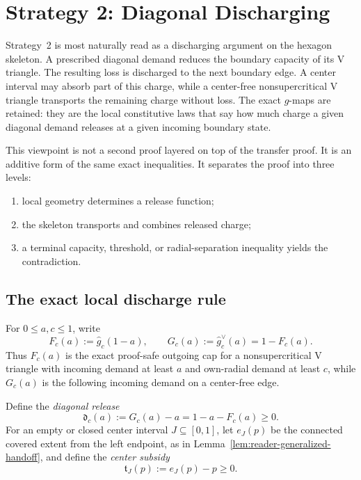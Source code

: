 \section{Strategy 2: Diagonal Discharging}
\label{sec:strategy2-discharging}

Strategy~2 is most naturally read as a discharging argument on the hexagon
skeleton.  A prescribed diagonal demand reduces the boundary capacity of its
V triangle.  The resulting loss is discharged to the next boundary edge.  A
center interval may absorb part of this charge, while a center-free
nonsupercritical V triangle transports the remaining charge without loss.  The
exact \(g\)-maps are retained: they are the local constitutive laws that say
how much charge a given diagonal demand releases at a given incoming boundary
state.

This viewpoint is not a second proof layered on top of the transfer proof.
It is an additive form of the same exact inequalities.  It separates the
proof into three levels:
\begin{enumerate}
\item local geometry determines a release function;
\item the skeleton transports and combines released charge;
\item a terminal capacity, threshold, or radial-separation inequality yields
      the contradiction.
\end{enumerate}

\subsection{The exact local discharge rule}

For \(0\le a,c\le1\), write
\[
 F_c(a):=\widehat g_c(1-a),
 \qquad
 G_c(a):=\widehat g_c^\vee(a)=1-F_c(a).
\]
Thus \(F_c(a)\) is the exact proof-safe outgoing cap for a
nonsupercritical V triangle with incoming demand at least \(a\) and own-radial
demand at least \(c\), while \(G_c(a)\) is the following incoming demand on a
center-free edge.

\begin{definition}
\label{def:body-diagonal-release}
Define the \emph{diagonal release}
\begin{equation}
 \mathfrak d_c(a)
 :=G_c(a)-a
 =1-a-F_c(a)
 \ge0.
 \label{eq:body-diagonal-release}
\end{equation}
For an empty or closed center interval \(J\subseteq[0,1]\), let
\(e_J(p)\) be the connected covered extent from the left endpoint, as in
Lemma~\ref{lem:reader-generalized-handoff}, and define the
\emph{center subsidy}
\begin{equation}
 \mathfrak t_J(p):=e_J(p)-p\ge0.
 \label{eq:body-center-subsidy}
\end{equation}
\end{definition}

